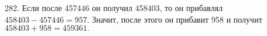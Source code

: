282. Если после 457446 он получил 458403, то он прибавлял $458403-457446=957.$ Значит, после этого он прибавит 958 и получит $458403+958=459361.$\\
